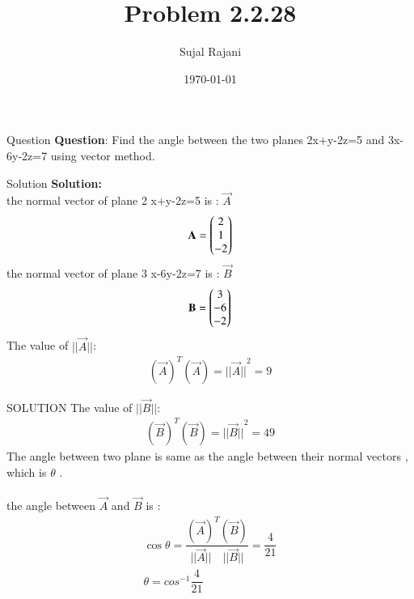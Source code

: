 \documentclass{beamer}
\title{Problem 2.2.28}
\author{Sujal Rajani}
\date{\today}
\begin{document}
\begin{frame}
\titlepage
\end{frame}



\begin{frame}{Question}
\textbf{Question}:
\noindent Find the angle between the two planes 2x+y-2z=5 and 3x-6y-2z=7 using vector method.
\end{frame}

\begin{frame}{Solution}
\textbf{Solution:} 
\\
 the   normal vector of plane 2 x+y-2z=5 is : $\vec{A}$
 \begin{align*}
     \mathbf{A}=\begin{pmatrix}2\\1\\-2\end{pmatrix}
 \end{align*}
 the normal vector of plane 3 x-6y-2z=7 is : $\vec{B}$
 \begin{align*}
     \mathbf{B}=\begin{pmatrix}3\\-6\\-2\end{pmatrix}
 \end{align*} 
 The value of $||\vec{A}||$:
  \begin{align*}
     (\vec{A})^T(\vec{A})={||\vec{A}||}^2=9
 \end{align*}
 \end{frame} 
 
 \begin{frame}{SOLUTION}
 The value of $||\vec{B}||$:
  \begin{align*}
     (\vec{B })^T(\vec{B})={||\vec{B}||}^2=49
 \end{align*}
 The angle between two plane is same as the angle between their normal vectors , which is  $\theta$ .
\\
\\
 the angle between $\vec{A}$ and $\vec{B}$ is :
 \begin{align*}
      \cos{\theta} = \dfrac{(\vec{A})^T(\vec{B})}{||\vec{A}||\quad||\vec{B}||}=\dfrac{4}{21}
       \\
      \theta=cos^{-1}\dfrac{4}{21}
 \end{align*}
 \end{frame}
\end{document}

